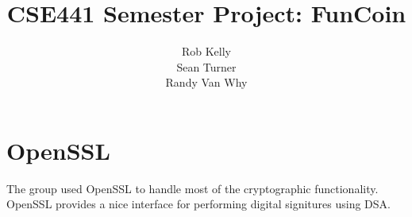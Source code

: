 \documentclass[12pt]{article}
\begin{document}
\title{CSE441 Semester Project: FunCoin}
\author{Rob Kelly\\Sean Turner\\Randy Van Why}
\maketitle


\section{OpenSSL}
The group used OpenSSL to handle most of the cryptographic functionality. OpenSSL provides a nice interface for performing digital signitures using DSA.
\end{document}
